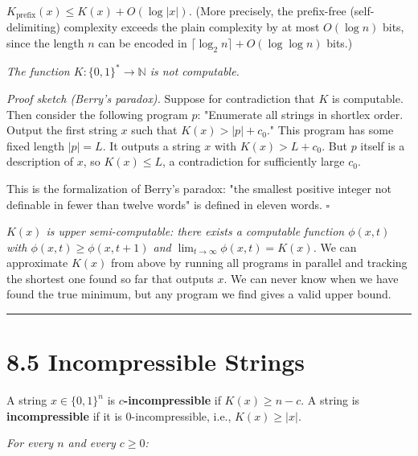 \begin{proposition}
\textit{$K_{\text{prefix}}(x) \leq K(x) + O(\log |x|)$.} (More precisely, the prefix-free (self-delimiting) complexity exceeds the plain complexity by at most $O(\log n)$ bits, since the length $n$ can be encoded in $\lceil \log_2 n \rceil + O(\log \log n)$ bits.)
\end{proposition}

\begin{theorem}
\textit{The function $K : \{ 0,1\} ^* \to \mathbb{N}$ is not computable.}

\textit{Proof sketch (Berry's paradox).} Suppose for contradiction that $K$ is computable. Then consider the following program $p$: "Enumerate all strings in shortlex order. Output the first string $x$ such that $K(x) > |p| + c_0$." This program has some fixed length $|p| = L$. It outputs a string $x$ with $K(x) > L + c_0$. But $p$ itself is a description of $x$, so $K(x) \leq L$, a contradiction for sufficiently large $c_0$.

This is the formalization of Berry's paradox: "the smallest positive integer not definable in fewer than twelve words" is defined in eleven words. $\square$
\end{theorem}

\begin{proposition}
\textit{$K(x)$ is upper semi-computable: there exists a computable function $\phi(x, t)$ with $\phi(x, t) \geq \phi(x, t+1)$ and $\lim_{t \to \infty} \phi(x, t) = K(x)$.} We can approximate $K(x)$ from above by running all programs in parallel and tracking the shortest one found so far that outputs $x$. We can never know when we have found the true minimum, but any program we find gives a valid upper bound.

\bigskip\hrule\bigskip
\end{proposition}

\section{8.5 Incompressible Strings}

\begin{definition}
A string $x \in \{ 0,1\} ^n$ is \textbf{$c$-incompressible} if $K(x) \geq n - c$. A string is \textbf{incompressible} if it is $0$-incompressible, i.e., $K(x) \geq |x|$.
\end{definition}

\begin{theorem}
\textit{For every $n$ and every $c \geq 0$:}
\end{theorem}

